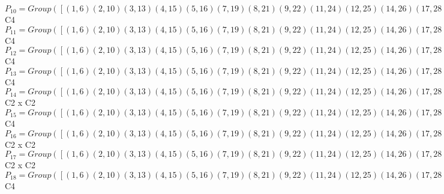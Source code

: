 \documentclass[varwidth=\maxdimen,border=10]{standalone}
\begin{document}
\begin{tabular}
$P_{10} = Group( [ ( 1, 6)( 2,10)( 3,13)( 4,15)( 5,16)( 7,19)( 8,21)( 9,22)(11,24)(12,25)(14,26)(17,28)(18,29)(20,30)(23,31)(27,32), ( 1,14, 6,26)( 2,20,10,30)( 3,23,13,31)( 4,16,15, 5)( 7,27,19,32)( 8,22,21, 9)(11,25,24,12)(17,29,28,18) ] )\cong$ C4\ \\
$P_{11} = Group( [ ( 1, 6)( 2,10)( 3,13)( 4,15)( 5,16)( 7,19)( 8,21)( 9,22)(11,24)(12,25)(14,26)(17,28)(18,29)(20,30)(23,31)(27,32), ( 1, 3, 6,13)( 2, 7,10,19)( 4,24,15,11)( 5,12,16,25)( 8,28,21,17)( 9,18,22,29)(14,31,26,23)(20,32,30,27) ] )\cong$ C4\ \\
$P_{12} = Group( [ ( 1, 6)( 2,10)( 3,13)( 4,15)( 5,16)( 7,19)( 8,21)( 9,22)(11,24)(12,25)(14,26)(17,28)(18,29)(20,30)(23,31)(27,32), ( 1,12, 6,25)( 2,18,10,29)( 3,16,13, 5)( 4,31,15,23)( 7,22,19, 9)( 8,32,21,27)(11,14,24,26)(17,20,28,30) ] )\cong$ C4\ \\
$P_{13} = Group( [ ( 1, 6)( 2,10)( 3,13)( 4,15)( 5,16)( 7,19)( 8,21)( 9,22)(11,24)(12,25)(14,26)(17,28)(18,29)(20,30)(23,31)(27,32), ( 1,24, 6,11)( 2,28,10,17)( 3, 4,13,15)( 5,31,16,23)( 7, 8,19,21)( 9,32,22,27)(12,14,25,26)(18,20,29,30) ] )\cong$ C4\ \\
$P_{14} = Group( [ ( 1, 6)( 2,10)( 3,13)( 4,15)( 5,16)( 7,19)( 8,21)( 9,22)(11,24)(12,25)(14,26)(17,28)(18,29)(20,30)(23,31)(27,32), ( 1,17)( 2,11)( 3, 8)( 4, 7)( 5,32)( 6,28)( 9,31)(10,24)(12,30)(13,21)(14,29)(15,19)(16,27)(18,26)(20,25)(22,23) ] )\cong$ C2 x C2\ \\
$P_{15} = Group( [ ( 1, 6)( 2,10)( 3,13)( 4,15)( 5,16)( 7,19)( 8,21)( 9,22)(11,24)(12,25)(14,26)(17,28)(18,29)(20,30)(23,31)(27,32), ( 1,18, 6,29)( 2,12,10,25)( 3, 9,13,22)( 4,32,15,27)( 5,19,16, 7)( 8,31,21,23)(11,30,24,20)(14,17,26,28) ] )\cong$ C4\ \\
$P_{16} = Group( [ ( 1, 6)( 2,10)( 3,13)( 4,15)( 5,16)( 7,19)( 8,21)( 9,22)(11,24)(12,25)(14,26)(17,28)(18,29)(20,30)(23,31)(27,32), ( 1,19)( 2,13)( 3,10)( 4,17)( 5,18)( 6, 7)( 8,11)( 9,12)(14,32)(15,28)(16,29)(20,31)(21,24)(22,25)(23,30)(26,27) ] )\cong$ C2 x C2\ \\
$P_{17} = Group( [ ( 1, 6)( 2,10)( 3,13)( 4,15)( 5,16)( 7,19)( 8,21)( 9,22)(11,24)(12,25)(14,26)(17,28)(18,29)(20,30)(23,31)(27,32), ( 1,30)( 2,26)( 3,27)( 4, 9)( 5, 8)( 6,20)( 7,23)(10,14)(11,29)(12,28)(13,32)(15,22)(16,21)(17,25)(18,24)(19,31) ] )\cong$ C2 x C2\ \\
$P_{18} = Group( [ ( 1, 6)( 2,10)( 3,13)( 4,15)( 5,16)( 7,19)( 8,21)( 9,22)(11,24)(12,25)(14,26)(17,28)(18,29)(20,30)(23,31)(27,32), ( 1,31, 6,23)( 2,32,10,27)( 3,14,13,26)( 4,25,15,12)( 5,24,16,11)( 7,20,19,30)( 8,29,21,18)( 9,28,22,17) ] )\cong$ C4\ \\

\end{tabular}
\end{document}

